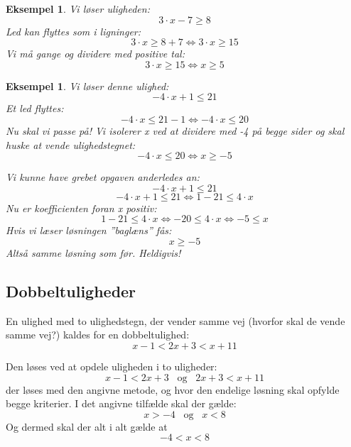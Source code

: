 \documentclass[12pt,oneside,a4paper]{article}
\newtheorem{eks}[thm]{Eksempel}
\begin{document}
\begin{eks}
Vi løser uligheden:
$$
3 \cdot x - 7 \geq 8
$$
Led kan flyttes som i ligninger:
$$
3 \cdot x \geq 8+7 \Leftrightarrow 3 \cdot x \geq 15
$$
Vi må gange og dividere med positive tal:
$$
3 \cdot x \geq 15 \Leftrightarrow x \geq 5
$$
\end{eks}

\begin{eks}
Vi løser denne ulighed:
$$
-4 \cdot x + 1 \leq 21
$$
Et led flyttes:
$$
-4 \cdot x \leq 21 -1 \Leftrightarrow -4 \cdot x \leq 20
$$
Nu skal vi passe på! Vi isolerer x ved at dividere med -4 på begge sider og skal huske at vende ulighedstegnet:
$$
-4 \cdot x \leq 20 \Leftrightarrow x \geq-5
$$

Vi kunne have grebet opgaven anderledes an:
$$
-4 \cdot x + 1 \leq 21
$$
$$
-4 \cdot x + 1 \leq 21 \Leftrightarrow 1 - 21 \leq 4 \cdot x
$$
Nu er koefficienten foran x positiv:
$$
1-21 \leq 4 \cdot x \Leftrightarrow -20 \leq 4 \cdot x \Leftrightarrow -5 \leq x
$$
Hvis vi læser løsningen ”baglæns” fås:
$$
x \geq -5
$$
Altså samme løsning som før. Heldigvis!
\end{eks}

\subsection{Dobbeltuligheder}
En ulighed med to ulighedstegn, der vender samme vej (hvorfor skal de vende samme vej?) kaldes for en dobbeltulighed:
$$
x-1 < 2x + 3 < x+11
$$

Den løses ved at opdele uligheden i to uligheder:
$$
x - 1 < 2x + 3 \;\;\; \text{og} \;\;\; 2x + 3 < x + 11
$$
der løses med den angivne metode, og hvor den endelige løsning skal opfylde begge kriterier. I det angivne tilfælde skal der gælde:
$$
x>-4 \;\;\; \text{og} \;\;\; x<8
$$
Og dermed skal der alt i alt gælde at
$$
-4 < x < 8
$$
\end{document}
